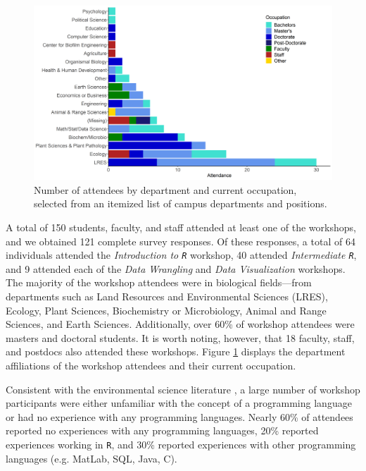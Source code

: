 \documentclass[12pt]{article}
\begin{document}
{
\begin{figure}[h!]
\centering
\includegraphics[width = \textwidth]{images/better_colors_attendance.png}
\caption{Number of attendees by department and current occupation, selected from
an itemized list of campus departments and positions.}
    \label{fig:departments}
\end{figure}
}

\quad A total of 150 students, faculty, and staff attended at least one of the
workshops, and we obtained 121 complete survey responses. Of these responses, a 
total of 64 individuals attended the \emph{Introduction to \texttt{R}} workshop,
40 attended \emph{Intermediate \texttt{R}}, and 9 attended each of the 
\emph{Data Wrangling} and \emph{Data Visualization} workshops. The
majority of the workshop attendees were in biological fields---from departments
such as Land Resources and Environmental Sciences (LRES), Ecology, Plant
Sciences, Biochemistry or Microbiology, Animal and Range Sciences, and Earth
Sciences. Additionally, over 60\% of workshop attendees were masters and
doctoral students. It is worth noting, however, that 18 faculty, staff, and
postdocs also attended these workshops. Figure \ref{fig:departments} displays
the department affiliations of the workshop attendees and their current 
occupation. 

\quad Consistent with the environmental science literature \citep{andelman, 
hampton, hernandez, datacarpentry}, a large number of workshop participants were
either unfamiliar with the concept of a programming language or had no
experience with any programming languages. Nearly 60\% of attendees reported no experiences with any programming
languages, 20\% reported experiences working in \texttt{R}, and 30\% reported
experiences with other programming languages (e.g. MatLab, SQL, Java, C). 
\end{document}
